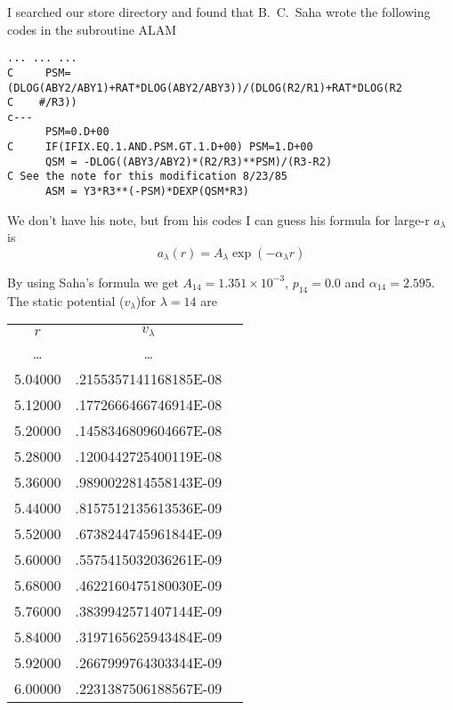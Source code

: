 \documentclass[aps,pra,groupedaddress,
                amsfonts,amssymb,
                preprint
    ]{revtex4}
\begin{document}
I searched our store directory and found that B.~C.~Saha wrote the
following codes in the subroutine ALAM
\begin{center}
\begin{verbatim}
... ... ...
C     PSM=(DLOG(ABY2/ABY1)+RAT*DLOG(ABY2/ABY3))/(DLOG(R2/R1)+RAT*DLOG(R2
C    #/R3))
c---
      PSM=0.D+00
C     IF(IFIX.EQ.1.AND.PSM.GT.1.D+00) PSM=1.D+00
      QSM = -DLOG((ABY3/ABY2)*(R2/R3)**PSM)/(R3-R2)
C See the note for this modification 8/23/85
      ASM = Y3*R3**(-PSM)*DEXP(QSM*R3)
\end{verbatim}
\end{center}
We don't have his note, but from his codes I can guess his formula for
large-r $a_\lambda$ is
\begin{equation}
  \label{eq:sahalal}
  a_\lambda(r) = A_\lambda\exp(-\alpha_\lambda r)
\end{equation}

By using Saha's formula we get $A_{14} = 1.351\times 10^{-3}$, $p_{14} =
0.0$ and $\alpha_{14} = 2.595$. The static potential ($v_\lambda$)for
$\lambda = 14$ are
\begin{center}
\begin{tabular}{ccc}
     $r$   &    $v_\lambda$ \\
   \ldots  &  \ldots               \\
   5.04000 &  \quad  .2155357141168185E-08 \\
   5.12000 &  \quad  .1772666466746914E-08 \\
   5.20000 &  \quad  .1458346809604667E-08 \\
   5.28000 &  \quad  .1200442725400119E-08 \\
   5.36000 &  \quad  .9890022814558143E-09 \\
   5.44000 &  \quad  .8157512135613536E-09 \\
   5.52000 &  \quad  .6738244745961844E-09 \\
   5.60000 &  \quad  .5575415032036261E-09 \\
   5.68000 &  \quad  .4622160475180030E-09 \\
   5.76000 &  \quad  .3839942571407144E-09 \\
   5.84000 &  \quad  .3197165625943484E-09 \\
   5.92000 &  \quad  .2667999764303344E-09 \\
   6.00000 &  \quad  .2231387506188567E-09
\end{tabular}
\end{center}
\end{document}
